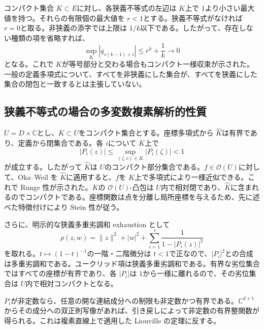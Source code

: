 \documentclass[12pt]{amsart}
\theoremstyle{definition}
\theoremstyle{remark}
\numberwithin{equation}{section}
\newcommand{\C}{\mathbb{C}}
\begin{document}
コンパクト集合 \allowbreak$K\subset E$\allowbreak に対し、各狭義不等式の左辺は \allowbreak$K$\allowbreak 上で \allowbreak$1$\allowbreak より小さい最大値を持つ。それらの有限個の最大値を \allowbreak$r<1$\allowbreak とする。狭義不等式がなければ \allowbreak$r=0$\allowbreak と取る。非狭義の添字では上限は \allowbreak$1/k$\allowbreak 以下である。したがって、存在しない種類の項を省略すれば、
\[
\sup_K|q_{s(k-1)+i}|\leq r^k+\frac1k\longrightarrow0
\]
となる。これで \allowbreak$K$\allowbreak が等号部分と交わる場合もコンパクト一様収束が示された。一般の定義多項式について、すべてを非狭義にした集合が、すべてを狭義にした集合の閉包と一致するとは主張していない。

\subsection{狭義不等式の場合の多変数複素解析的性質}
\allowbreak$U=D\times\C$\allowbreak とし、\allowbreak$K\subset U$\allowbreak をコンパクト集合とする。座標多項式から \allowbreak$\widehat K$\allowbreak は有界であり、定義から閉集合である。各 \allowbreak$i$\allowbreak について \allowbreak$\widehat K$\allowbreak 上で
\[
|P_i(z)|\leq\sup_{(\zeta,v)\in K}|P_i(\zeta)|<1
\]
が成立する。したがって \allowbreak$\widehat K$\allowbreak は \allowbreak$U$\allowbreak のコンパクト部分集合である。\allowbreak$f\in\mathcal O(U)$\allowbreak に対して、Oka--Weil を \allowbreak$\widehat K$\allowbreak に適用すると、\allowbreak$f$\allowbreak を \allowbreak$K$\allowbreak 上で多項式により一様近似できる。これで Runge 性が示された。\allowbreak$K$\allowbreak の \allowbreak$\mathcal O(U)$\allowbreak-凸包は \allowbreak$U$\allowbreak 内で相対閉であり、\allowbreak$\widehat K$\allowbreak に含まれるのでコンパクトである。座標関数は点を分離し局所座標を与えるため、先に述べた特徴付けにより Stein 性が従う。

さらに、明示的な狭義多重劣調和 exhaustion として
\[
\rho(z,w)=\|z\|^2+|w|^2+
\sum_{i=1}^s\frac1{1-|P_i(z)|^2}
\]
を取れる。\allowbreak$t\mapsto(1-t)^{-1}$\allowbreak の一階・二階微分は \allowbreak$t<1$\allowbreak で正なので、\allowbreak$|P_i|^2$\allowbreak との合成は多重劣調和である。ユークリッド項は狭義多重劣調和である。有界な劣位集合ではすべての座標が有界であり、各 \allowbreak$|P_i|$\allowbreak は \allowbreak$1$\allowbreak から一様に離れるので、その劣位集合は \allowbreak$U$\allowbreak 内で相対コンパクトとなる。

\allowbreak$P_i$\allowbreak が非定数なら、任意の開な連結成分への制限も非定数かつ有界である。\allowbreak$\C^{d+1}$\allowbreak からその成分への双正則写像があれば、引き戻しによって非定数の有界整関数が得られる。これは複素直線上で適用した Liouville の定理に反する。
\end{document}
